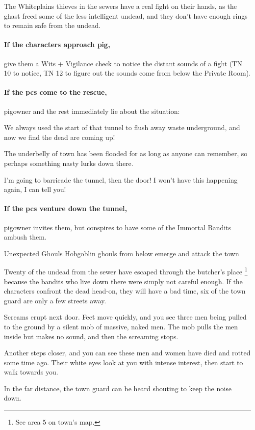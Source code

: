 
The Whiteplains thieves in the sewers have a real fight on their hands, as the ghast freed some of the less intelligent undead, and they don't have enough rings to remain safe from the undead.

\paragraph{If the characters approach \gls{pig},}
give them a Wits + Vigilance check  to notice the distant sounds of a fight (TN 10 to notice, TN 12 to figure out the sounds come from below the Private Room).

\paragraph{If the \glspl{pc} come to the rescue,}
\gls{pigowner} and the rest immediately lie about the situation:

\begin{speechtext}
  We always used the start of that tunnel to flush away waste underground, and now we find the dead are coming up!

  The underbelly of \gls{town} has been flooded for as long as anyone can remember, so perhaps something nasty lurks down there.

  I'm going to barricade the tunnel, then the door!
  I won't have this happening again, I can tell you!
\end{speechtext}

\paragraph{If the \glspl{pc} venture down the tunnel,}
\gls{pigowner} invites them, but conspires to have some of the Immortal Bandits ambush them.

{\N\N Unexpected Ghouls}%
{Hobgoblin ghouls from below emerge and attack the town}%

Twenty of the undead from the sewer have escaped through the butcher's place%
\footnote{See area 5 on \gls{town}'s map.}
because the bandits who live down there were simply not careful enough.
If the characters confront the dead head-on, they will have a bad time, six of the town guard are only a few streets away.

\begin{boxtext}

  Screams erupt next door.
  Feet move quickly, and you see three men being pulled to the ground by a silent mob of massive, naked men.
  The mob pulls the men inside but makes no sound, and then the screaming stops.

  Another steps closer, and you can see these men and women have died and rotted some time ago.
  Their white eyes look at you with intense interest, then start to walk towards you.

  In the far distance, the town guard can be heard shouting to keep the noise down.

\end{boxtext}

